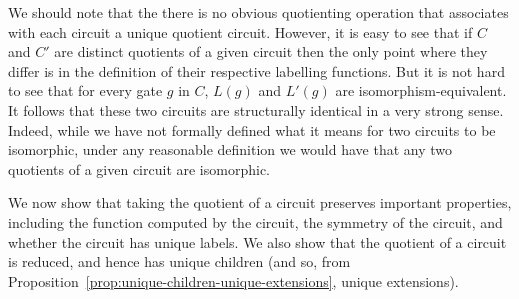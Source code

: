 \documentclass[../paper.tex]{subfiles}
\begin{document}
We should note that the there is no obvious quotienting operation that
associates with each circuit a unique quotient circuit. However, it is easy to
see that if $C$ and $C'$ are distinct quotients of a given circuit then the only
point where they differ is in the definition of their respective labelling
functions. But it is not hard to see that for every gate $g$ in $C$, $L(g)$ and
$L'(g)$ are isomorphism-equivalent. It follows that these two circuits are
structurally identical in a very strong sense. Indeed, while we have not
formally defined what it means for two circuits to be isomorphic, under any
reasonable definition we would have that any two quotients of a given circuit
are isomorphic.

We now show that taking the quotient of a circuit preserves important
properties, including the function computed by the circuit, the symmetry of the
circuit, and whether the circuit has unique labels. We also show that the
quotient of a circuit is reduced, and hence has unique children (and so, from
Proposition~\ref{prop:unique-children-unique-extensions}, unique extensions).
\end{document}

